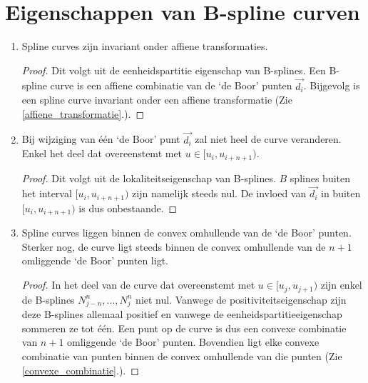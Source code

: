 \documentclass[notities.tex]{subfiles}
\begin{document}
\section{Eigenschappen van B-spline curven}
\begin{enumerate}
\item Spline curves zijn invariant onder affiene transformaties.
\begin{proof}
Dit volgt uit de eenheidspartitie eigenschap van B-splines. Een B-spline curve is een affiene combinatie van de `de Boor' punten $\vec{d_i}$. Bijgevolg is een spline curve invariant onder een affiene transformatie (Zie \ref{affiene_transformatie}.).
\end{proof}

\item Bij wijziging van \'e\'en `de Boor' punt $\vec{d_i}$ zal niet heel de curve veranderen. Enkel het deel dat overeenstemt met $u \in [u_i,u_{i+n+1})$.
\begin{proof}
Dit volgt uit de lokaliteitseigenschap van B-splines. $B$ splines buiten het interval $[u_i,u_{i+n+1})$ zijn namelijk steeds nul. De invloed van $\vec{d_i}$ in buiten $[u_i,u_{i+n+1})$ is dus onbestaande.
\end{proof}

\item
Spline curves liggen binnen de convex omhullende van de `de Boor' punten. Sterker nog, de curve ligt steeds binnen de convex omhullende van de $n+1$ omliggende `de Boor' punten ligt.

\begin{proof}
In het deel van de curve dat overeenstemt met $u \in [u_j,u_{j+1})$ zijn enkel de B-splines $N_{j-n}^{n},..., N_{j}^{n}$ niet nul. Vanwege de positiviteitseigenschap zijn deze B-splines allemaal positief en vanwege de eenheidspartitieeigenschap sommeren ze tot \'e\'en. Een punt op de curve is dus een convexe combinatie van $n+1$ omliggende `de Boor' punten. Bovendien ligt elke convexe combinatie van punten binnen de convex omhullende van die punten (Zie \ref{convexe_combinatie}.).
\end{proof}
\end{enumerate}
\end{document}
